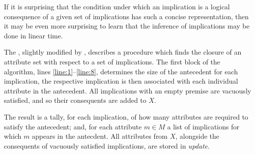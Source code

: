 If it is surprising that the condition under which an implication is a logical consequence of a given set of
implications has such a concise representation, then it may be even more surprising to learn that the inference of implications
may be done in linear time.

The  \cite{maier1983chapter4}, slightly modified by \cite{ganter2016conceptual}, describes
a procedure which finds the closure of an attribute set with respect to a set of implications. The first block of the algorithm,
lines \ref{line:1}--\ref{line:8}, determines the size of the antecedent for each implication, the respective implication
is then associated with each individual attribute in the antecedent. All implications with an empty premise are
vacuously satisfied, and so their consequents are added to $X$.

The result is a tally, for each implication, of how many attributes are required to satisfy the antecedent; and, for each
attribute $m \in M$ a list of implications for which $m$ appears in the antecdent. All attributes from $X$, alongside the
consequents of vacuously satisfied implications, are stored in \textit{update}.

